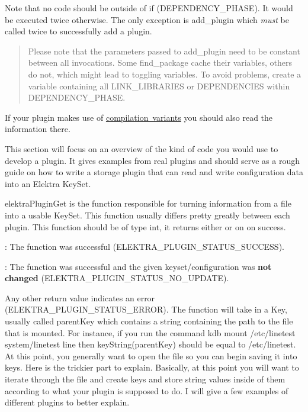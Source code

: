 Note that no code should be outside of {\ttfamily if (D\+E\+P\+E\+N\+D\+E\+N\+C\+Y\+\_\+\+P\+H\+A\+SE)}. It would be executed twice otherwise. The only exception is {\ttfamily add\+\_\+plugin} which {\itshape must} be called twice to successfully add a plugin.

\begin{quote}
Please note that the parameters passed to {\ttfamily add\+\_\+plugin} need to be constant between all invocations. Some {\ttfamily find\+\_\+package} cache their variables, others do not, which might lead to toggling variables. To avoid problems, create a variable containing all {\ttfamily L\+I\+N\+K\+\_\+\+L\+I\+B\+R\+A\+R\+I\+ES} or {\ttfamily D\+E\+P\+E\+N\+D\+E\+N\+C\+I\+ES} within {\ttfamily D\+E\+P\+E\+N\+D\+E\+N\+C\+Y\+\_\+\+P\+H\+A\+SE}. \end{quote}


If your plugin makes use of \mbox{\hyperlink{doc_tutorials_compilation-variants_md}{compilation variants}} you should also read the information there.

This section will focus on an overview of the kind of code you would use to develop a plugin. It gives examples from real plugins and should serve as a rough guide on how to write a storage plugin that can read and write configuration data into an Elektra {\ttfamily Key\+Set}.

{\ttfamily elektra\+Plugin\+Get} is the function responsible for turning information from a file into a usable {\ttfamily Key\+Set}. This function usually differs pretty greatly between each plugin. This function should be of type {\ttfamily int}, it returns either {} or on {} on success.


\begin{DoxyItemize}
\item {}\+: The function was successful ({\ttfamily E\+L\+E\+K\+T\+R\+A\+\_\+\+P\+L\+U\+G\+I\+N\+\_\+\+S\+T\+A\+T\+U\+S\+\_\+\+S\+U\+C\+C\+E\+SS}).
\item {}\+: The function was successful and the given keyset/configuration was {\bfseries{not changed}} ({\ttfamily E\+L\+E\+K\+T\+R\+A\+\_\+\+P\+L\+U\+G\+I\+N\+\_\+\+S\+T\+A\+T\+U\+S\+\_\+\+N\+O\+\_\+\+U\+P\+D\+A\+TE}).
\end{DoxyItemize}

Any other return value indicates an error ({\ttfamily E\+L\+E\+K\+T\+R\+A\+\_\+\+P\+L\+U\+G\+I\+N\+\_\+\+S\+T\+A\+T\+U\+S\+\_\+\+E\+R\+R\+OR}). The function will take in a {\ttfamily Key}, usually called {\ttfamily parent\+Key} which contains a string containing the path to the file that is mounted. For instance, if you run the command {\ttfamily kdb mount /etc/linetest system/linetest line} then {\ttfamily key\+String(parent\+Key)} should be equal to {\ttfamily /etc/linetest}. At this point, you generally want to open the file so you can begin saving it into keys. Here is the trickier part to explain. Basically, at this point you will want to iterate through the file and create keys and store string values inside of them according to what your plugin is supposed to do. I will give a few examples of different plugins to better explain.

